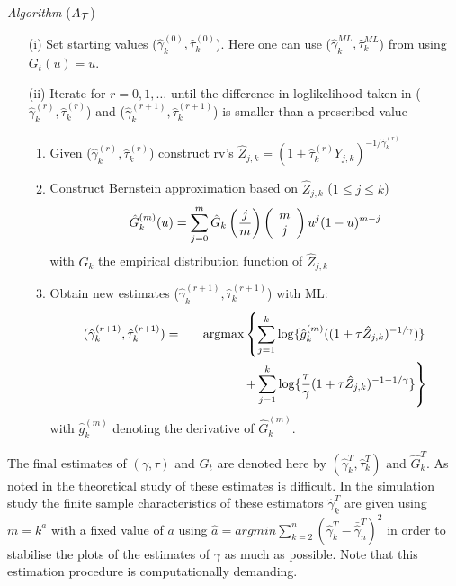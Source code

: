 \begin{enumerate}
\vspace{0.3cm}\noindent
{\it Algorithm} ($A_{\cal T}$) 
\begin{enumerate}
\item[(i)] Set starting values ($\hat{\gamma}_k^{(0)},\hat{\tau}_k^{(0)}$). Here one can use ($\hat{\gamma}_k^{ML},\hat{\tau}_k^{ML}$) from using $G_t (u)=u$.
\item[(ii)]
Iterate for $r=0,1,\ldots$ until the difference in loglikelihood taken in ($\hat{\gamma}_k^{(r)},\hat{\tau}_k^{(r)}$) and ($\hat{\gamma}_k^{(r+1)},\hat{\tau}_k^{(r+1)}$) is smaller than a prescribed value
\begin{enumerate}
\item Given ($\hat{\gamma}_k^{(r)},\hat{\tau}_k^{(r)}$)
construct rv's 
$ \hat{Z}_{j,k}= \left( 1+ \hat{\tau}_k^{(r)}Y_{j,k}\right)^{-1/\hat{\gamma}_k^{(r)}} 
$
\item Construct Bernstein approximation based on $\hat{Z}_{j,k}$ ($1\leq j \leq k$)
\[
\hat{G}_k^{(m)}(u) = \sum_{j=0}^m \hat{G}_k \left( {j \over m}\right)\left( \begin{array}{c} m \\ j \end{array}\right)u^j (1-u)^{m-j}
\]
with $\hat{G}_k$ the empirical distribution function of $\hat{Z}_{j,k}$
\item Obtain new estimates ($\hat{\gamma}_k^{(r+1)},\hat{\tau}_k^{(r+1)}$) with ML:
\begin{eqnarray*}
(\hat{\gamma}_k^{(r+1)},\hat{\tau}_k^{(r+1)})&=&
\mbox{argmax} \left\{
\sum_{j=1}^k \log \{ \hat{g}^{(m)}_k ((1+\tau \hat{Z}_{j,k})^{-1/\gamma})\} \right.\\
&& \hspace{1.5cm} \left. + \sum_{j=1}^k
\log \{{\tau \over \gamma}(1+\tau \hat{Z}_{j,k})^{-1-1/\gamma} \} \right\}
\end{eqnarray*}
with $\hat{g}^{(m)}_k $ denoting the derivative of $\hat{G}_k^{(m)}$.
\end{enumerate}
\end{enumerate}

\vspace{0.3cm}\noindent
The final estimates of $(\gamma,\tau)$ and $G_t$ are denoted here by $(\hat{\gamma}_k^T,\hat{\tau}_k^T)$ and $\hat{G}_k^T$. 
As noted in \cite{tencaliec2018flexible} the theoretical study of these estimates is difficult. In the simulation study the finite sample characteristics of these estimators $\hat{\gamma}_k^T$ are given using $m=k^a$ with a fixed value of $a$ using $\hat{a} = argmin \sum_{k=2}^n (\hat{\gamma}_k^T - \bar{\hat{\gamma}}^T_n)^2$ in order to stabilise the plots of the estimates of $\gamma$ as much as possible. Note that this estimation procedure is computationally demanding.


\end{enumerate}
